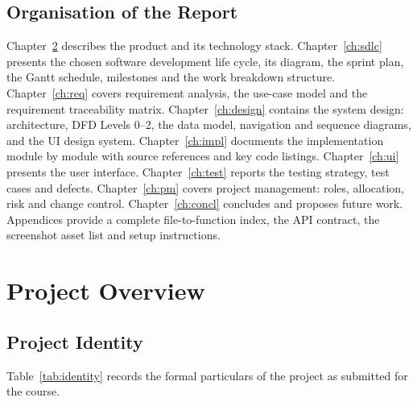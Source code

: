 \documentclass[12pt,a4paper,oneside]{report}
\begin{document}
\section{Organisation of the Report}
Chapter~\ref{ch:overview} describes the product and its technology stack.
Chapter~\ref{ch:sdlc} presents the chosen software development life cycle, its
diagram, the sprint plan, the Gantt schedule, milestones and the work breakdown
structure. Chapter~\ref{ch:req} covers requirement analysis, the use-case model and
the requirement traceability matrix. Chapter~\ref{ch:design} contains the system
design: architecture, DFD Levels 0--2, the data model, navigation and sequence
diagrams, and the UI design system. Chapter~\ref{ch:impl} documents the
implementation module by module with source references and key code listings.
Chapter~\ref{ch:ui} presents the user interface. Chapter~\ref{ch:test} reports the
testing strategy, test cases and defects. Chapter~\ref{ch:pm} covers project
management: roles, allocation, risk and change control. Chapter~\ref{ch:concl}
concludes and proposes future work. Appendices provide a complete file-to-function
index, the API contract, the screenshot asset list and setup instructions.

\chapter{Project Overview}\label{ch:overview}

\section{Project Identity}

Table~\ref{tab:identity} records the formal particulars of the project as submitted for the course.
\end{document}
